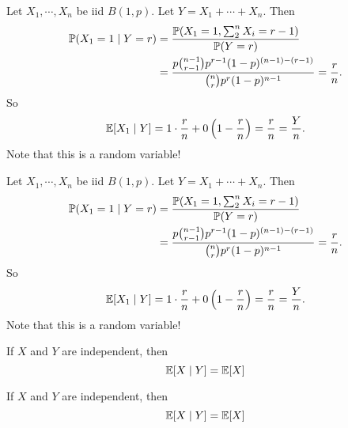 \begin{note}
  \begin{field}
    \begin{eg}
      Let $X_1, \cdots, X_n$ be iid $B(1, p)$. Let $Y = X_1 + \cdots + X_n$. Then
      \begin{align*}
        \P(X_1 = 1\mid Y = r) &= \frac{\P(X_1 = 1, \sum_{2}^n X_i = r - 1)}{\P(Y = r)}\\
        &= \frac{p\binom{n - 1}{r - 1}p^{r - 1}(1 - p)^{(n - 1) - (r - 1)}}{\binom{n}{r} p^r (1 - p)^{n - 1}} = \frac{r}{n}.
      \end{align*}
      So
      \[
        \E[X_1\mid Y] = 1 \cdot \frac{r}{n} + 0\left(1 - \frac{r}{n}\right) = \frac{r}{n} = \frac{Y}{n}.
      \]
      Note that this is a random variable!
    \end{eg}
  \end{field}
  \begin{field}
    \begin{eg}
      Let $X_1, \cdots, X_n$ be iid $B(1, p)$. Let $Y = X_1 + \cdots + X_n$. Then
      \begin{align*}
        \P(X_1 = 1\mid Y = r) &= \frac{\P(X_1 = 1, \sum_{2}^n X_i = r - 1)}{\P(Y = r)}\\
        &= \frac{p\binom{n - 1}{r - 1}p^{r - 1}(1 - p)^{(n - 1) - (r - 1)}}{\binom{n}{r} p^r (1 - p)^{n - 1}} = \frac{r}{n}.
      \end{align*}
      So
      \[
        \E[X_1\mid Y] = 1 \cdot \frac{r}{n} + 0\left(1 - \frac{r}{n}\right) = \frac{r}{n} = \frac{Y}{n}.
      \]
      Note that this is a random variable!
    \end{eg}
  \end{field}
  \xplain{}%
\end{note}

\begin{note}
  \begin{field}
    \begin{thm}
      If $X$ and $Y$ are independent, then
      \[
        \E[X\mid Y] = \E[X]
      \]
    \end{thm}
  \end{field}
  \begin{field}
    \begin{thm}
      If $X$ and $Y$ are independent, then
      \[
        \E[X\mid Y] = \E[X]
      \]
    \end{thm}
  \end{field}
  \xplain{}%
\end{note}

